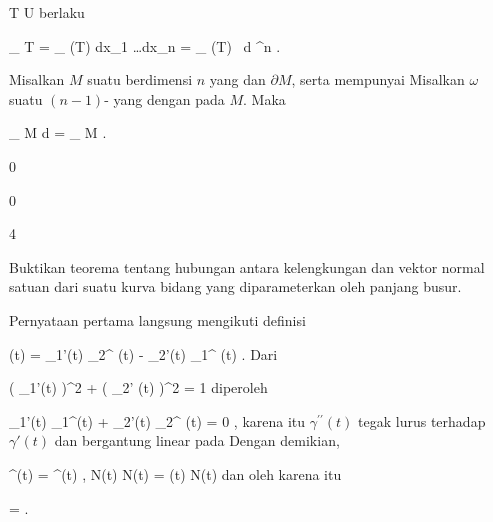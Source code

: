 {{\mavergleichskette
{\vergleichskette
{ T
}
{ \subseteq }{ U
}
{  }{
}
{    }{
}
{   }{
}
}
{}{}{}
berlaku

\mavergleichskettedisp
{\vergleichskette
{
\int_{  T   }  \omega
}
{ =} {
\int_{ \alpha(T)  }    dx_1 \wedge \ldots \wedge dx_n
}
{ =} { \int_{ \alpha(T)  }       \,  d \lambda^n
}
{ } {
}
{ } {
}
}
{}{}{.}}{Misalkan $M$ suatu
berdimensi $n$ yang
dan
$\partial M$, serta mempunyai
Misalkan $\omega$ suatu
$(n-1)$-
yang
dengan
 pada $M$. Maka

\mavergleichskettedisp
{\vergleichskette
{
\int_{ M  }  d\omega
}
{ =} {
\int_{ \partial M  }  \omega
}
{ } {
}
{ } {
}
{ } {
}
}
{}{}{.}}

 }



{0}

{

}
{  }



{0}

{

}
{  }



{4}

{

Buktikan teorema tentang hubungan antara kelengkungan dan vektor normal satuan dari suatu kurva bidang yang diparameterkan oleh panjang busur.

}
{

Pernyataan pertama langsung mengikuti definisi

\mavergleichskettedisp
{\vergleichskette
{ \kappa(t)
}
{ =} { \gamma_1'(t) \gamma_2^{\prime \prime} (t) - \gamma_2'(t) \gamma_1^{\prime \prime} (t)
}
{ } {
}
{ } {
}
{ } {
}
}
{}{}{.}
Dari

\mavergleichskettedisp
{\vergleichskette
{ \left(  \gamma_1'(t)  \right)^2 +  \left(  \gamma_2' (t)  \right)^2
}
{ =} { 1
}
{ } {
}
{ } {
}
{ } {
}
}
{}{}{}
diperoleh

\mavergleichskettedisp
{\vergleichskette
{ \gamma_1'(t) \gamma_1^{\prime \prime}(t) + \gamma_2'(t) \gamma_2^{\prime \prime} (t)
}
{ =} { 0
}
{ } {
}
{ } {
}
{ } {
}
}
{}{}{,}
karena itu $\gamma^{\prime \prime}(t)$ tegak lurus terhadap $\gamma'(t)$ dan bergantung linear pada
 Dengan demikian,

\mavergleichskettedisp
{\vergleichskette
{ \gamma^{\prime \prime}(t)
}
{ =} { \left\langle  \gamma^{\prime \prime}(t) ,  N(t)  \right\rangle  N(t)
}
{ =} { \kappa(t) N(t)
}
{ } {
}
{ } {
}
}
{}{}{}
dan oleh karena itu

\mavergleichskettedisp
{\vergleichskette
{  \Vert
}
{ =} { 
}
{ } {
}
{ } {
}
{ } {
}
}
{}{}{.}

 }



